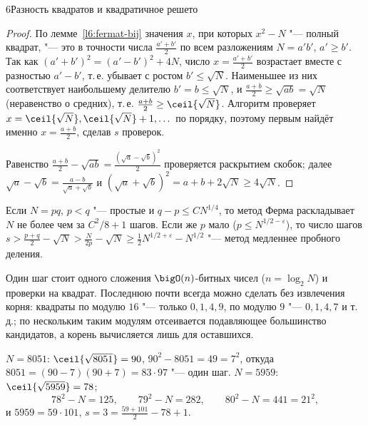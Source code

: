 \begin{lecture}{6}{Разность квадратов и квадратичное решето}
\begin{proof}
По лемме~\ref{l6:fermat-bij} значения $x$, при которых $x^2 - N$ "--- полный квадрат, "---
это в точности числа $\frac{a' + b'}{2}$ по всем разложениям $N = a'b'$, $a' \ge b'$. Так как
$(a' + b')^2 = (a' - b')^2 + 4N$, число $x = \frac{a' + b'}{2}$ возрастает вместе с разностью
$a' - b'$, т.\,е. убывает с ростом $b' \le \sqrt N$. Наименьшее из них соответствует наибольшему
делителю $b' = b \le \sqrt N$, и $\frac{a + b}{2} \ge \sqrt{ab} = \sqrt N$ (неравенство о средних),
т.\,е. $\frac{a+b}{2} \ge \ceil{\sqrt N}$. Алгоритм проверяет $x = \ceil{\sqrt N}, \ceil{\sqrt N} + 1, \dots$
по порядку, поэтому первым найдёт именно $x = \frac{a+b}{2}$, сделав $s$ проверок.

Равенство $\frac{a + b}{2} - \sqrt{ab} = \frac{(\sqrt a - \sqrt b)^2}{2}$ проверяется раскрытием
скобок; далее $\sqrt a - \sqrt b = \frac{a - b}{\sqrt a + \sqrt b}$ и
$(\sqrt a + \sqrt b)^2 = a + b + 2\sqrt N \ge 4\sqrt N$.
\end{proof}

\begin{corollary}\label{l6:fermat-close}
Если $N = pq$, $p < q$ "--- простые и $q - p \le C N^{1/4}$, то метод Ферма раскладывает $N$
не более чем за $C^2/8 + 1$ шагов. Если же $p$ мало ($p \le N^{1/2 - \varepsilon}$), то число
шагов $s > \frac{p + q}{2} - \sqrt N > \frac{N}{2p} - \sqrt N \ge \frac12 N^{1/2 + \varepsilon} - N^{1/2}$
"--- метод медленнее пробного деления.
\end{corollary}

Один шаг стоит одного сложения $\bigO(n)$-битных чисел ($n = \log_2 N$) и проверки на квадрат.
Последнюю почти всегда можно сделать без извлечения корня: квадраты по модулю $16$ "--- только
$0, 1, 4, 9$, по модулю $9$ "--- $0, 1, 4, 7$ и т.\,д.; по нескольким таким модулям отсеивается
подавляющее большинство кандидатов, а корень вычисляется лишь для оставшихся.

\begin{example}\label{l6:ex-fermat}
$N = 8051$: $\ceil{\sqrt{8051}} = 90$, $90^2 - 8051 = 49 = 7^2$, откуда
$8051 = (90 - 7)(90 + 7) = 83 \cdot 97$ "--- один шаг.
$N = 5959$: $\ceil{\sqrt{5959}} = 78$;
\[
  78^2 - N = 125, \qquad 79^2 - N = 282, \qquad 80^2 - N = 441 = 21^2,
\]
и $5959 = 59 \cdot 101$, $s = 3 = \frac{59 + 101}{2} - 78 + 1$.
\end{example}



\end{lecture}
